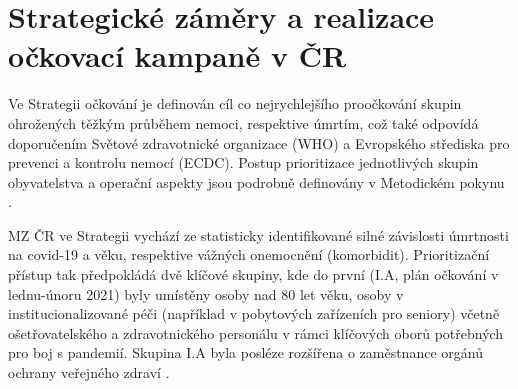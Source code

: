 




\section*{Strategické záměry a realizace očkovací kampaně v ČR}
\label{sec:strategie}

Ve Strategii očkování \cite{strategie_covid} je definován cíl co nejrychlejšího proočkování skupin ohrožených těžkým průběhem nemoci, respektive úmrtím, což také odpovídá doporučením Světové zdravotnické organizace (WHO) a Evropského střediska pro prevenci a kontrolu nemocí (ECDC). Postup prioritizace jednotlivých skupin obyvatelstva a operační aspekty jsou podrobně definovány v Metodickém pokynu \cite{ockovani_mp}. %
%

MZ ČR ve Strategii vychází ze statisticky identifikované silné závislosti úmrtnosti na covid-19 a věku, respektive vážných onemocnění (komorbidit). Prioritizační přístup tak předpokládá dvě klíčové skupiny, kde do první (I.A, plán očkování v lednu-únoru 2021) byly umístěny osoby nad 80 let věku, osoby v institucionalizované péči (například v pobytových zařízeních pro seniory) včetně ošetřovatelského a zdravotnického personálu v rámci klíčových oborů potřebných pro boj s pandemií. Skupina I.A byla posléze rozšířena o zaměstnance orgánů ochrany veřejného zdraví \cite{prioritizace_hygiena}. 

